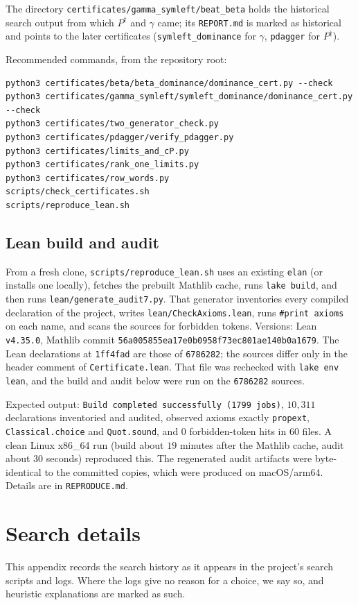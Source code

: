 \documentclass[11pt]{amsart}
\theoremstyle{definition}
\theoremstyle{remark}
\newcommand{\pin}{1ff4fad}
\begin{document}
The directory \texttt{certificates/gamma\_symleft/beat\_beta} holds the historical search output from which $P^\dagger$ and $\gamma$ came; its \texttt{REPORT.md} is marked as historical and points to the later certificates (\texttt{symleft\_dominance} for $\gamma$, \texttt{pdagger} for $P^\dagger$).

Recommended commands, from the repository root:
\begin{lstlisting}
python3 certificates/beta/beta_dominance/dominance_cert.py --check
python3 certificates/gamma_symleft/symleft_dominance/dominance_cert.py --check
python3 certificates/two_generator_check.py
python3 certificates/pdagger/verify_pdagger.py
python3 certificates/limits_and_cP.py
python3 certificates/rank_one_limits.py
python3 certificates/row_words.py
scripts/check_certificates.sh
scripts/reproduce_lean.sh
\end{lstlisting}

\subsection*{Lean build and audit}
From a fresh clone, \texttt{scripts/reproduce\_lean.sh} uses an existing \texttt{elan} (or installs one locally), fetches the prebuilt Mathlib cache, runs \texttt{lake build}, and then runs \texttt{lean/generate\_audit7.py}. That generator inventories every compiled declaration of the project, writes \texttt{lean/CheckAxioms.lean}, runs \texttt{\#print axioms} on each name, and scans the sources for forbidden tokens. Versions: Lean \texttt{v4.35.0}, Mathlib commit \texttt{56a005855ea17e0b0958f73ec801ae140b0a1679}. The Lean declarations at \texttt{\pin} are those of \texttt{6786282}; the sources differ only in the header comment of \texttt{Certificate.lean}. That file was rechecked with \texttt{lake env lean}, and the build and audit below were run on the \texttt{6786282} sources.

Expected output: \texttt{Build completed successfully (1799 jobs)}, $10{,}311$ declarations inventoried and audited, observed axioms exactly \texttt{propext}, \texttt{Classical.choice} and \texttt{Quot.sound}, and $0$ forbidden-token hits in $60$ files. A clean Linux x86\_64 run (build about $19$ minutes after the Mathlib cache, audit about $30$ seconds) reproduced this. The regenerated audit artifacts were byte-identical to the committed copies, which were produced on macOS/arm64. Details are in \texttt{REPRODUCE.md}.

\section{Search details}\label{app:search}
This appendix records the search history as it appears in the project's search scripts and logs. Where the logs give no reason for a choice, we say so, and heuristic explanations are marked as such.
\end{document}
